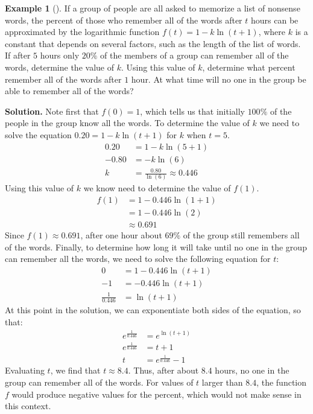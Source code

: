 \documentclass[10pt,]{book}
\theoremstyle{plain}
\theoremstyle{definition}
\theoremstyle{definition}
\newtheorem{example}[theorem]{Example}
\theoremstyle{definition}
\numberwithin{equation}{section}
\newcommand{\amp}{&}
\begin{document}
\begin{example}[]\label{example-31}
\hypertarget{p-376}{}%
If a group of people are all asked to memorize a list of nonsense words, the percent of those who remember all of the words after \(t\) hours can be approximated by the logarithmic function \(f(t) = 1 - k\ln \left( t + 1 \right)\), where \(k\) is a constant that depends on several factors, such as the length of the list of words.  If after \(5\) hours only \(20\%\) of the members of a group can remember all of the words, determine the value of \(k\). Using this value of \(k\), determine what percent remember all of the words after \(1\) hour. At what time will no one in the group be able to remember all of the words?%
\par\smallskip%
\noindent\textbf{Solution.}\hypertarget{solution-31}{}\quad%
\hypertarget{p-377}{}%
Note first that \(f(0) = 1\), which tells us that initially \(100\%\) of the people in the group know all the words. To determine the value of \(k\) we need to solve the equation \(0.20 = 1 - k \ln \left( t + 1 \right)\) for \(k\) when \(t = 5\).%
\begin{align*}
0.20 \amp = 1 - k \ln \left( 5 + 1 \right)\\
-0.80 \amp = -k \ln \left( 6 \right)\\
k \amp = \frac{0.80}{\ln(6)} \approx 0.446
\end{align*}
Using this value of \(k\) we know need to determine the value of \(f(1)\).%
\begin{align*}
f(1) \amp = 1 - 0.446 \ln \left( 1 + 1 \right)\\
\amp = 1 - 0.446 \ln \left( 2 \right)\\
\amp \approx 0.691
\end{align*}
Since \(f(1) \approx 0.691\), after one hour about \(69\%\) of the group still remembers all of the words. Finally, to determine how long it will take until no one in the group can remember all the words, we need to solve the following equation for \(t\):%
\begin{align*}
0 \amp = 1 - 0.446 \ln \left( t + 1 \right)\\
-1 \amp = -0.446 \ln \left( t + 1 \right)\\
\frac{1}{0.446} \amp = \ln \left( t + 1 \right)
\end{align*}
At this point in the solution, we can exponentiate both sides of the equation, so that:%
\begin{align*}
e^{ \frac{1}{0.446}} \amp = e^{\ln \left( t + 1 \right)}\\
e^{ \frac{1}{0.446}} \amp = t + 1\\
t \amp = e^{ \frac{1}{0.446}} - 1
\end{align*}
Evaluating \(t\), we find that \(t \approx 8.4\). Thus, after about \(8.4\) hours, no one in the group can remember all of the words. For values of \(t\) larger than \(8.4\), the function \(f\) would produce negative values for the percent, which would not make sense in this context.%
\end{example}
\typeout{************************************************}
\typeout{************************************************}
\end{document}
